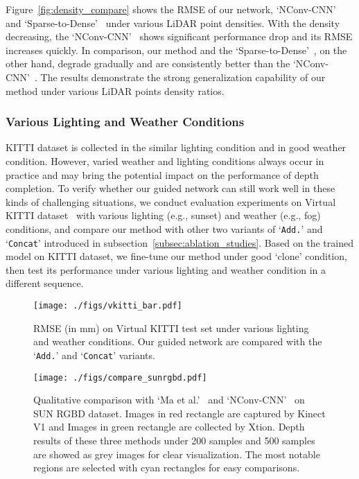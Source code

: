 \documentclass[journal]{IEEEtran}
\begin{document}
Figure~\ref{fig:density_compare} shows the RMSE of our network, `NConv-CNN'~\cite{cnn_confidence} and `Sparse-to-Dense'~\cite{self_supervised} under various LiDAR point densities.
With the density decreasing, the `NConv-CNN'~\cite{cnn_confidence} shows significant performance drop and its RMSE increases quickly.
In comparison, our method and the `Sparse-to-Dense'~\cite{self_supervised}, on the other hand, degrade gradually and are consistently better than the `NConv-CNN'~\cite{cnn_confidence}.
The results demonstrate the strong generalization capability of our method under various LiDAR points density ratios.


\subsubsection{Various Lighting and Weather Conditions}
KITTI dataset is collected in the similar lighting condition and in good weather condition.
However, varied weather and lighting conditions always occur in practice and may bring the potential impact on the performance of depth completion.
To verify whether our guided network can still work well in these kinds of challenging situations,
we conduct evaluation experiments on Virtual KITTI dataset~\cite{vkitti} with various lighting (e.g., sunset) and weather (e.g., fog) conditions,
and compare our method with other two variants of `\texttt{Add.}' and `\texttt{Concat}' introduced in subsection~\ref{subsec:ablation_studies}.
Based on the trained model on KITTI dataset, we fine-tune our method under good `clone' condition, then test its performance under various lighting and weather condition in a different sequence.   


\begin{figure}
   \begin{center}
   \texttt{[image: ./figs/vkitti\_bar.pdf]}
   \end{center}
      \caption{RMSE (in $\mathrm{mm}$) on Virtual KITTI test set under various lighting and weather conditions.
      Our guided network are compared with the `\texttt{Add.}' and `\texttt{Concat}' variants.}
   \label{fig:compare_vkitti}
\end{figure}

\begin{figure*}
   \begin{center}
   \texttt{[image: ./figs/compare\_sunrgbd.pdf]}
   \end{center}
      \caption{Qualitative comparison with `Ma et al.'~\cite{sparse_to_dense} and `NConv-CNN'~\cite{cnn_confidence} on SUN RGBD dataset.
      Images in red rectangle are captured by Kinect V1 and Images in green rectangle are collected by Xtion.
      Depth results of these three methods under 200 samples and 500 samples are showed as grey images for clear visualization.
      The most notable regions are selected with cyan rectangles for easy comparisons.}
   \label{fig:compare_sunrgbd}
\end{figure*}
\end{document}
